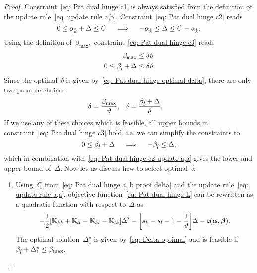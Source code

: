 \begin{proof}
  Constraint~\eqref{eq: Pat dual hinge c1} is always satisfied from the definition of the update rule~\eqref{eq: update rule a,b}. Constraint~\eqref{eq: Pat dual hinge c2} reads
  \begin{equation}\label{eq: Pat dual hinge c2 update a,a}
    0 \leq \alpha_{\hat{k}} + \Delta \leq C
    \quad \implies \quad
    - \alpha_{\hat{k}} \leq \Delta \leq C - \alpha_{\hat{k}}.
  \end{equation}
  Using the definition of~$\beta_{\max},$ constraint~\eqref{eq: Pat dual hinge c3} reads
  \begin{align*}
    \beta_{\max} & \leq \delta \vartheta \\
    0 \leq \beta_{\hat{l}} + \Delta & \leq \delta \vartheta
  \end{align*}
  Since the optimal~$\delta$ is given by~\eqref{eq: Pat dual hinge optimal delta}, there are only two possible choices
  \begin{align}\label{eq: Pat dual hinge a, b proof delta}
    \delta & = \frac{\beta_{\max}}{\vartheta}, &
    \delta & = \frac{\beta_{\hat{l}} + \Delta}{\vartheta}.
  \end{align}
  If we use any of these choices which is feasible, all upper bounds in constraint~\eqref{eq: Pat dual hinge c3} hold, i.e. we can simplify the constraints to
  \begin{equation*}
    0 \leq \beta_{\hat{l}} + \Delta
    \quad \implies \quad
    - \beta_{\hat{l}} \leq \Delta,
  \end{equation*}
  which in combination with~\eqref{eq: Pat dual hinge c2 update a,a} gives the lower and upper bound of~$\Delta.$ Now let us discuss how to select optimal~$\delta:$
  \begin{enumerate}
    \item Using~$\delta^{\star}_1$ from~\eqref{eq: Pat dual hinge a, b proof delta} and the update rule~\eqref{eq: update rule a,a}, objective function~\eqref{eq: Pat dual hinge L} can be rewritten as a quadratic function with respect to~$\Delta$ as
    \begin{equation*}
      - \frac{1}{2} \Brac[s]{\K_{kk} + \K_{ll} - \K_{kl} - \K_{lk}} \Delta^2
      - \Brac[s]{s_k - s_l - 1 - \frac{1}{\vartheta}} \Delta
      - c(\bm{\alpha}, \bm{\beta}).
    \end{equation*}
    The optimal solution~$\Delta^{\star}_1$ is given by~\eqref{eq: Delta optimal} and is feasible if~$\beta_{\hat{l}} + \Delta^{\star}_1 \leq \beta_{\max}$.


\end{enumerate}
\end{proof}
